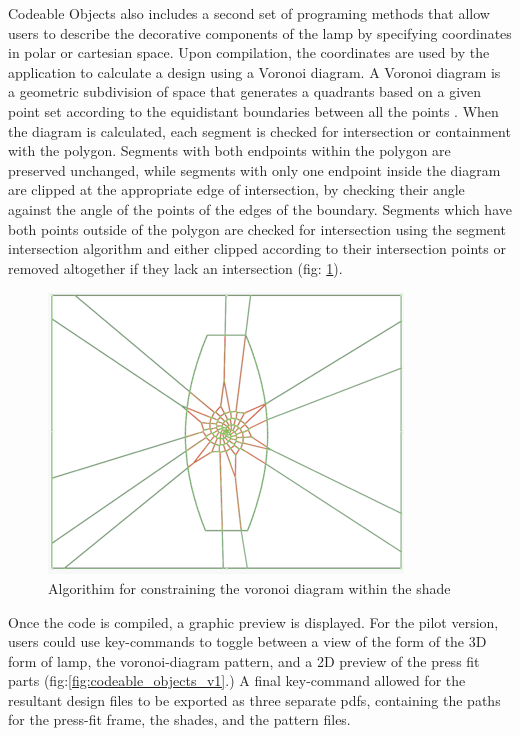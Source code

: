  Codeable Objects also includes a second set of programing methods that allow users to describe the  decorative components of the lamp by specifying coordinates in polar or cartesian space. Upon compilation, the coordinates are used by the application to calculate a design using a Voronoi diagram. A Voronoi diagram is a geometric subdivision of space that generates a quadrants based on a given point set according to the equidistant boundaries between all the points \cite{deBerg}. When the diagram is calculated, each segment is checked for intersection or containment with the polygon. Segments with both endpoints within the polygon are preserved unchanged, while segments with only one endpoint inside the diagram are clipped at the appropriate edge of intersection, by checking their angle against the angle of the points of the edges of the boundary. Segments which have both points outside of the polygon are checked for intersection using the segment intersection algorithm and either clipped according to their intersection points or removed altogether if they lack an intersection (fig: \ref{fig:voronoi_clipped}).
 \begin{figure}
  \vspace{-20pt}
 \begin{center}
\includegraphics[scale=0.5]{images/voronoi_clipped.png}
\end{center}
\caption{Algorithim for constraining the voronoi diagram within the shade}
\label{fig:voronoi_clipped}
  \vspace{-10pt}
\end{figure}
  
Once the code is compiled, a graphic preview is displayed. For the pilot version, users could use key-commands to toggle between a view of the form of the 3D form of lamp, the voronoi-diagram pattern, and a 2D preview of the press fit parts (fig:\ref{fig:codeable_objects_v1}.) A final key-command allowed for the resultant design files to be exported as three separate pdfs, containing the paths for the press-fit frame, the shades, and the pattern files. 


